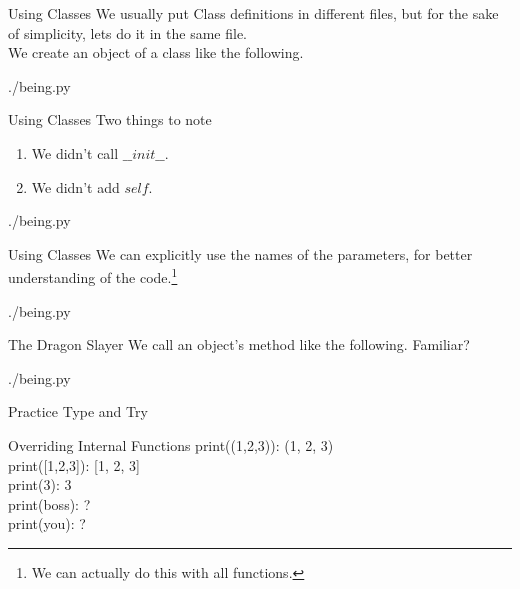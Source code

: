 \documentclass{beamer}
\begin{document}
\begin{frame}{Using Classes}
  We usually put Class definitions in different files, but for the sake of
  simplicity, lets do it in the same file.\\
  We create an object of a class like the following.
  \begin{lstinputlisting}[firstline=25, lastline=27]
    {./being.py}
  \end{lstinputlisting}
\end{frame}

\begin{frame}{Using Classes}
  Two things to note
  \begin{enumerate}
    \item We didn't call $\_\_init\_\_$.
    \item We didn't add $self$.
  \end{enumerate}
  \begin{lstinputlisting}[firstline=25, lastline=25]
    {./being.py}
  \end{lstinputlisting}
\end{frame}

\begin{frame}{Using Classes}
  We can explicitly use the names of the parameters, for better understanding of the
  code.\footnote{We can actually do this with all functions.}
  \begin{lstinputlisting}[firstline=26, lastline=27]
    {./being.py}
  \end{lstinputlisting}
\end{frame}

\begin{frame}{The Dragon Slayer}
  We call an object's method like the following. Familiar?
  \begin{lstinputlisting}[firstline=29, lastline=29]
    {./being.py}
  \end{lstinputlisting}
\end{frame}

\begin{frame}{Practice}
  Type and Try
\end{frame}

\begin{frame}{Overriding Internal Functions}
  print((1,2,3)): (1, 2, 3)\\
  print([1,2,3]): [1, 2, 3]\\
  print(3): 3\\
  print(boss): ?\\
  print(you): ?
\end{frame}
\end{document}
